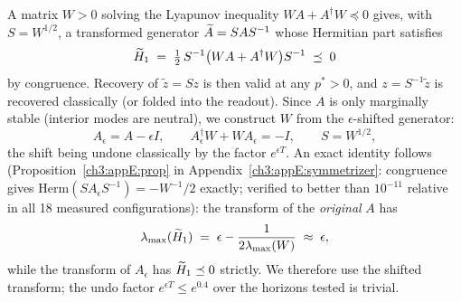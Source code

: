 A matrix $W>0$ solving the Lyapunov inequality
$WA + A^{\dagger}W\preceq0$ gives, with $S=W^{1/2}$, a transformed
generator $\widetilde{A} = SAS^{-1}$ whose Hermitian part satisfies
\begin{equation}
  \Ht \;=\; \tfrac12\, S^{-1}\bigl(WA + A^{\dagger}W\bigr)S^{-1}
  \;\preceq\; 0
  \label{ch3:eq:congruence}
\end{equation}
by congruence.  Recovery of $\tilde z = Sz$ is then valid at any
$p^{*}>0$, and $z = S^{-1}\tilde z$ is recovered classically (or folded
into the readout).  Since $A$ is only marginally stable (interior modes
are neutral), we construct $W$ from the $\epsilon$-shifted generator:
\begin{equation}
  A_\epsilon = A - \epsilon I, \qquad
  A_\epsilon^{\dagger}W + WA_\epsilon = -I, \qquad
  S = W^{1/2},
  \label{ch3:eq:lyapunov}
\end{equation}
the shift being undone classically by the factor $e^{\epsilon T}$.  An
exact identity follows (Proposition~\ref{ch3:appE:prop} in
Appendix~\ref{ch3:appE:symmetrizer}: congruence gives
$\mathrm{Herm}(SA_\epsilon S^{-1})=-W^{-1}/2$ exactly; verified to better
than $10^{-11}$ relative in all 18 measured configurations): the
transform of the \emph{original} $A$ has
\begin{equation}
  \lamax(\Ht) \;=\; \epsilon - \frac{1}{2\lamax(W)} \;\approx\; \epsilon,
  \label{ch3:eq:identity}
\end{equation}
while the transform of $A_\epsilon$ has $\widetilde{H}_1\preceq0$ strictly.  We
therefore use the shifted transform; the undo factor
$e^{\epsilon T}\le e^{0.4}$ over the horizons tested is trivial.

